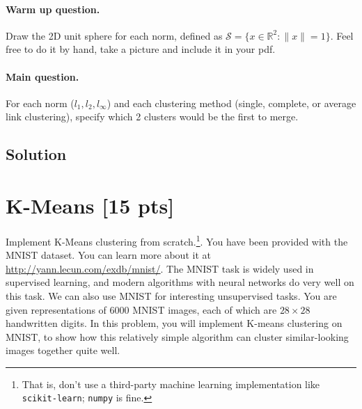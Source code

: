 \documentclass[submit]{harvardml}
\begin{document}
\begin{problem}
  \paragraph{Warm up question.} \noindent Draw the 2D unit sphere for each norm,
  defined as $\mathcal{S} = \{x \in \mathbb{R}^2: \|x\| = 1 \}$. Feel free to do
  it by hand, take a picture and include it in your pdf.

  \paragraph{Main question.}
  \noindent For each norm ($l_1, l_2, l_\infty$) and each clustering method
  (single, complete, or average link clustering), specify which 2 clusters would
  be the first to merge.
\end{problem}
\subsection*{Solution}

\newpage

\section*{K-Means [15 pts]}
Implement K-Means clustering from scratch.\footnote{That is, don't use a
third-party machine learning implementation like \texttt{scikit-learn};
\texttt{numpy} is fine.}. You have been provided with the MNIST dataset. You can
learn more about it at  \url{http://yann.lecun.com/exdb/mnist/}. The MNIST task
is widely used in supervised learning, and modern algorithms with neural
networks do very well on this task. We can also use MNIST for interesting
unsupervised tasks. You are given representations of 6000 MNIST images, each of
which are $28\times28$  handwritten digits. In this problem, you will implement
K-means clustering on MNIST, to show how this relatively simple algorithm can
cluster similar-looking images together quite well.
\end{document}
